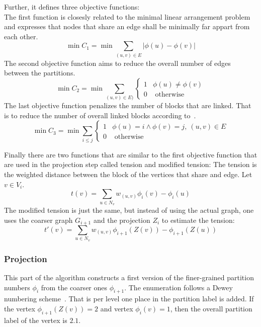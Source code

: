     Further, it defines three objective functions:\\
    The first function is closesly related to the minimal linear arrangement problem~\autocite{lewis1983computers} and expresses that nodes that share an edge shall be minimally far appart from each other.
    \[ \min C_1 = \min \sum_{(u,v) \in E} |\phi(u) - \phi(v)| \]
    The second objective function aims to reduce the overall number of edges between the partitions.
    \[\min C_2 = \min \sum_{(u,v) \in E)} \begin{cases}
        1 & \phi(u) \neq \phi(v) \\
        0 & \text{ otherwise}
    \end{cases}
\]
    The last objective function penalizes the number of blocks that are linked. That is to reduce the number of overall linked blocks according to~\autocite{steinhaus2010g}.
    \[ \min C_3 = \min \sum_{i \leq j} 
    \begin{cases}
        1 & \phi(u) = i \wedge \phi(v) = j, \ (u,v) \in E \\
        0 & \text{ otherwise}
    \end{cases}
    \]
    
    Finally there are two functions that are similar to the first objective function that are used in the projection step called tension and modified tension:
    The tension is the weighted distance between the block of the vertices that share and edge. Let $v \in V_i$.
    \[ t(v) = \sum_{u \in N_v} w_{(u,v)} \phi_i(v) - \phi_i(u)\]
     The modified tension is just the same, but instead of using the actual graph, one uses the coarser graph $G_{i+1}$ and the projection $Z_{i}$ to estimate the tension:
     \[ t'(v) = \sum_{u \in N_v} w_{(u, v)} \phi_{i+1}(Z(v)) - \phi_{i+1}(Z(u)) \]
    
        \subsubsection*{Projection}
        This part of the algorithm constructs a first version of the finer-grained partition numbers $\phi_i$ from the coarser ones $\phi_{i + 1}$.
        The enumeration follows a Dewey numbering scheme~\autocite{dewey1894decimal}.
        That is per level one place in the partition label is added. 
        If the vertex $\phi_{i+1}(Z(v)) = 2$ and vertex $\phi_i(v) = 1$, then the overall partition label of the vertex is $2\text{.}1$. 
        
